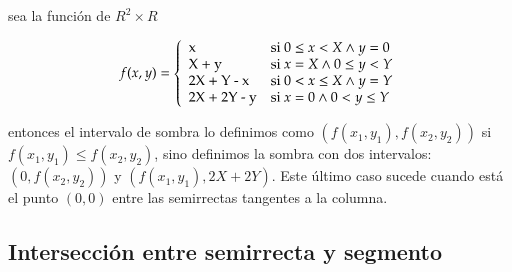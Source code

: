 \begin{itemize}
sea la función de $R^2 \times R$

\vspace{0.2cm}
\begin{center}
\[ f(x, y) = \left\{
               \begin{array}{llll}
				 $x$ & \mbox{si $0 \le x < X \wedge y = 0$} \\
				 $X + y$ & \mbox{si $x = X \wedge 0 \le y < Y$} \\
				 $2X + Y - x$ & \mbox{si $0 < x \le X \wedge y = Y$} \\
				 $2X + 2Y - y$ & \mbox{si $x = 0 \wedge 0 < y \le Y$}
			   \end{array}
			 \right.
\]
\end{center}
\vspace{0.2cm}

\end{itemize}

entonces el intervalo de sombra lo definimos como $(f(x_1,y_1), f(x_2,y_2))$ si
$f(x_1,y_1) \le f(x_2,y_2)$, sino definimos la sombra con dos intervalos: $(0, f(x_2,y_2))$ y
$(f(x_1,y_1), 2X + 2Y)$. Este último caso sucede cuando está el punto $(0,0)$ entre las 
semirrectas tangentes a la columna.

\subsection*{Intersección entre semirrecta y segmento}

